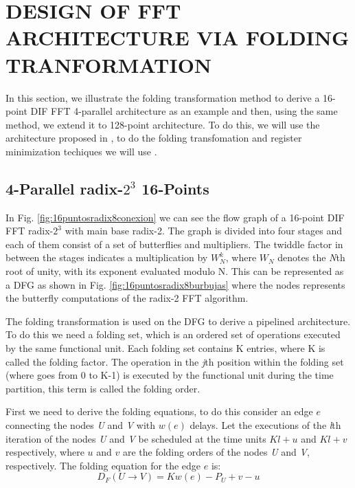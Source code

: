 \documentclass[journal,comsoc]{IEEEtran}
\begin{document}
\newpage
\section{DESIGN OF FFT ARCHITECTURE VIA FOLDING TRANFORMATION}
In this section, we illustrate the folding transformation method to derive a 16-point DIF FFT 4-parallel architecture as an example and then, using the same method, we extend it to 128-point architecture. To do this, we will use the architecture proposed in \cite{ayinala_pipelined_2012}, to do the folding transfomation and register minimization techiques we will use \cite{folding_parhi_book}.
\subsection{4-Parallel radix-$2^3$ 16-Points}
In Fig. \ref{fig:16puntosradix8conexion} we can see the flow graph of a 16-point DIF FFT radix-$2^3$ with main base radix-2. The graph is divided into four stages and each of them consist of a set of butterflies and multipliers. The twiddle factor in between the stages indicates a multiplication by $W^k_N$, where $W_N$ denotes the \textit{N}th root of unity, with its exponent evaluated modulo N. This can be represented as a DFG as shown in Fig. \ref{fig:16puntosradix8burbujas} where the nodes represents the butterfly computations of the radix-2 FFT algorithm. 

The folding transformation is used on the DFG to derive a pipelined architecture. To do this we need a folding set, which is an ordered set of operations executed by the same functional unit. Each folding set contains K entries, where K is called the folding factor. The operation in the \textit{j}th position within the folding set (where goes from 0 to K-1) is executed by the functional unit during the time partition, this term is called the folding order.

First we need to derive the folding equations, to do this consider an edge $e$ connecting the nodes \textit{U} and \textit{V} with $w(e)$ delays. Let the executions of the \textit{l}th iteration of the nodes \textit{U} and \textit{V} be scheduled at the time units $Kl+u$ and $Kl+v$ respectively, where $u$ and $v$ are the folding orders of the nodes \textit{U} and \textit{V}, respectively. The folding equation for the edge $e$ is:
\begin{equation}\label{eqn:fold_equation}
D_F(U \to V) = Kw(e)-P_U+v-u
\end{equation}
\end{document}
